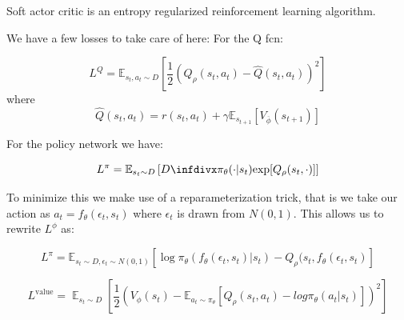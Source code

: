 \documentclass[letterpaper, 10 pt, conference]{ieeeconf}
\begin{document}
Soft actor critic \cite{haarnoja_soft_2018} is an entropy regularized reinforcement learning algorithm.%






We have a few losses to take care of here:
For the Q fcn:

\begin{dmath} L^{Q} = \mathbb{E}_{s_{t}, a_{t} \sim D}\left[\frac{1}{2}\left( Q_{\rho}(s_{t},a_{t}) - \hat{Q}(s_{t}, a_{t}) \right) ^{2}  \right] \end{dmath}
where
\begin{dmath} \hat{Q}(s_{t}, a_{t}) = r(s_{t}, a_{t}) + \gamma\mathbb{E}_{s_{t+1}}\left[V_{\overline{\phi}}(s_{t+1} ) \right]  \end{dmath}

For the policy network we have:

\begin{dmath} L^{\pi} = \mathbb{E}_{s_{t} \sim D} \left[\infdiv{\pi_{\theta}(\cdot  | s_{t})}{\exp[Q_{\rho}(s_{t}, \cdot)]} \right]  \end{dmath}

To minimize this we make use of a reparameterization trick, that is we take our action as $a_{t} = f_{\theta}(\epsilon_{t}, s_{t})$ where $\epsilon_{t}$ is drawn from $N(0,1)$. This allows us to rewrite $L^{\phi}$ as:


\begin{dmath} L^{\pi} = \mathbb{E}_{s_{t} \sim D, \epsilon_{t} \sim N(0,1)}\left[ \log \pi_{\theta}(f_{\theta}(\epsilon_{t}, s_{t}) | s_{t}) - Q_{\rho}(s_{t}, f_{\theta}(\epsilon_{t}, s_{t}) \right]\end{dmath}


\begin{dmath}L^{\text{value}} = 
\mathop{\mathbb{E}}_{s_{t} \sim D} \left[ \frac{1}{2} \left( V_{\phi}(s_{t}) - \mathbb{E}_{a_{t} \sim \pi_{\theta}} \left[Q_{\rho}(s_{t}, a_{t}) - log \pi_{\theta}(a_{t} | s_{t}) \right] \right)^{2}  \right] \end{dmath} 
\end{document}
